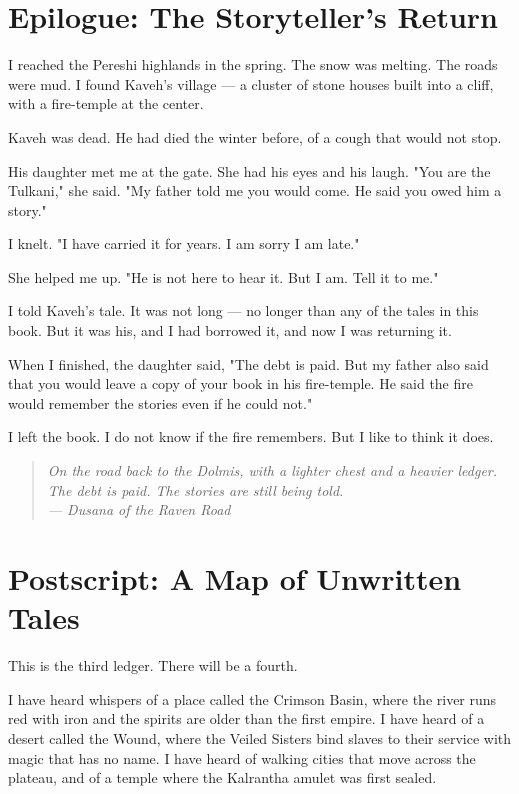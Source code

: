 \documentclass[10pt,twoside]{book}
\newcommand{\dusana}[1]{\begin{quote}\itshape #1 \\ --- Dusana of the Raven Road\end{quote}}
\begin{document}
\chapter*{Epilogue: The Storyteller's Return}

I reached the Pereshi highlands in the spring. The snow was melting. The roads were mud. I found Kaveh's village --- a cluster of stone houses built into a cliff, with a fire-temple at the center.

Kaveh was dead. He had died the winter before, of a cough that would not stop.

His daughter met me at the gate. She had his eyes and his laugh. "You are the Tulkani," she said. "My father told me you would come. He said you owed him a story."

I knelt. "I have carried it for years. I am sorry I am late."

She helped me up. "He is not here to hear it. But I am. Tell it to me."

I told Kaveh's tale. It was not long --- no longer than any of the tales in this book. But it was his, and I had borrowed it, and now I was returning it.

When I finished, the daughter said, "The debt is paid. But my father also said that you would leave a copy of your book in his fire-temple. He said the fire would remember the stories even if he could not."

I left the book. I do not know if the fire remembers. But I like to think it does.

\dusana{On the road back to the Dolmis, with a lighter chest and a heavier ledger. The debt is paid. The stories are still being told.}

\chapter*{Postscript: A Map of Unwritten Tales}

This is the third ledger. There will be a fourth.

I have heard whispers of a place called the Crimson Basin, where the river runs red with iron and the spirits are older than the first empire. I have heard of a desert called the Wound, where the Veiled Sisters bind slaves to their service with magic that has no name. I have heard of walking cities that move across the plateau, and of a temple where the Kalrantha amulet was first sealed.
\end{document}
